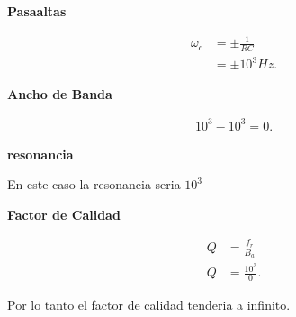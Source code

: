 \documentclass[12pt]{article}
\begin{document}
\textbf{Pasaaltas}

\begin{align*}
  \omega_c &= \pm \frac{1}{RC} \\
  &= \pm 10^{3}Hz 
.\end{align*}

\textbf{Ancho de Banda}

\begin{align*}
  10^{3} - 10^{3} = 0
.\end{align*}

\textbf{resonancia}

En este caso la resonancia seria $10^{3}$ 

\textbf{Factor de Calidad}

\begin{align*}
  Q &= \frac{f_r}{B_a} \\
  Q &= \frac{10^{3}}{0}
.\end{align*}

Por lo tanto el factor de calidad tenderia a infinito.
\end{document}
